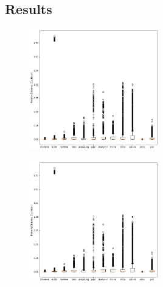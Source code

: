 \subsection{Results}

    \begin{figure}[htbp]
        \begin{minipage}{0.5\linewidth}
         \centering
         \includegraphics[width=0.5\textwidth]{nn1_siamese_5000_pd.png}
         \label{fig:circle}
        \end{minipage}%
        \begin{minipage}{0.5\linewidth}
         \centering
         \includegraphics[width=0.5\textwidth]{nn1_siamese_5000_pd.png}
         \label{fig:rectangle}
        \end{minipage}
       \end{figure}
